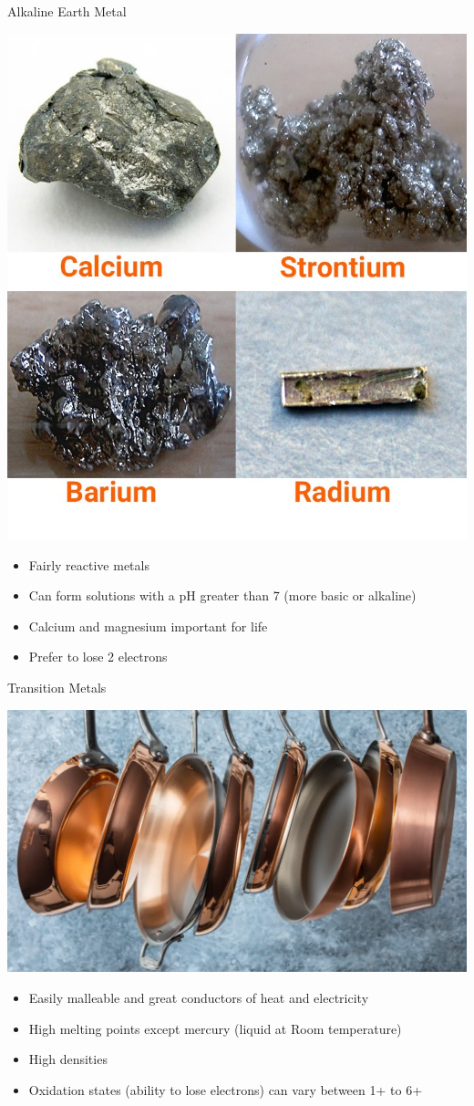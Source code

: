 \documentclass[11pt]{beamer}
\begin{document}
\begin{frame}{Alkaline Earth Metal}
  \begin{center}
    \includegraphics[width=0.4\linewidth]{alkaline_metal}
  \end{center}
  
  \begin{itemize}
  \item Fairly reactive metals
  \item Can form solutions with a pH greater than
    7 (more basic or alkaline)
  \item Calcium and magnesium important for life
  \item Prefer to lose 2 electrons
  \end{itemize}
\end{frame}

\begin{frame}{Transition Metals}
  \begin{center}
    \includegraphics[scale=0.12]{copper_pan}
  \end{center}
  
  \begin{itemize}
  \item Easily malleable and great conductors of heat and
    electricity
  \item High melting points except mercury (liquid at Room
    temperature)
  \item High densities
  \item Oxidation states (ability to lose electrons) can
    vary between 1+ to 6+
  \end{itemize}
\end{frame}
\end{document}
